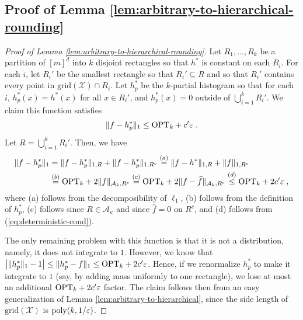 \documentclass[final,12pt]{colt2018} %
\newcommand{\eps}{\varepsilon}
\newcommand{\calX}{\mathcal{X}}
\newcommand{\fhat}{\widehat{f}}
\newcommand{\A}{\mathcal{A}}
\newcommand{\grid}{\mathrm{grid}}
\begin{document}
\subsection{Proof of Lemma \ref{lem:arbitrary-to-hierarchical-rounding}}
\begin{proof}[Proof of Lemma \ref{lem:arbitrary-to-hierarchical-rounding}]
Let $R_1, \ldots, R_k$ be a partition of $[m]^d$ into $k$ disjoint rectangles so that $h^*$ is constant on each $R_i$.
For each $i$, let $R_i'$ be the smallest rectangle so that $R_i' \subseteq R$ and so that $R_i'$ contains every point in $\grid (\calX) \cap R_i$.
Let $h^*_p$ be the $k$-partial histogram so that for each $i$, $h^*_p (x) = h^* (x)$ for all $x \in R_i'$, and $h^*_p (x) = 0$ outside of $\bigcup_{i = 1}^k R_i'$.
We claim this function satisfies 
\[
\| f - h^*_p \|_1 \leq \OPT_k + c' \eps \; .
\]
Let $R = \bigcup_{i = 1}^{k} R_i'$.
Then, we have
\begin{align*}
\| f - h^*_p \|_1 &= \| f - h^*_p \|_{1, R} + \| f - h^*_p \|_{1, R^c}  \stackrel{(a)}{=} \| f - h^* \|_{1, R} + \| f \|_{1, R^c} \\
&\stackrel{(b)}{=} \OPT_k + 2 \| f \|_{\A_k, R^c} \stackrel{(c)}{=} \OPT_k + 2 \| f - \fhat \|_{\A_k, R^c} \stackrel{(d)}{\leq} \OPT_k + 2 c' \eps \; ,
\end{align*}
where (a) follows from the decomposibility of $\ell_1$, (b) follows from the definition of $h^*_p$, (c) follows since $R \in \A_{\kappa}$ and since $\fhat = 0$ on $R^c$, and (d) follows from (\ref{eq:deterministic-cond}).

The only remaining problem with this function is that it is not a distribution, namely, it does not integrate to $1$.
However, we know that 
$\left| \| h^*_p \|_1 - 1 \right| \leq \| h^*_p - f \|_1 \leq \OPT_k + 2 c' \eps$.
Hence, if we renormalize $h^*_p$ to make it integrate to $1$ (say, by adding mass uniformly to one rectangle), we lose at most an additional $\OPT_k + 2 c' \eps$ factor.
The claim follows then from an easy generalization of Lemma \ref{lem:arbitrary-to-hierarchical}, since the side length of $\grid (\calX)$ is $\poly (k, 1 / \eps)$.
\end{proof}
\end{document}
